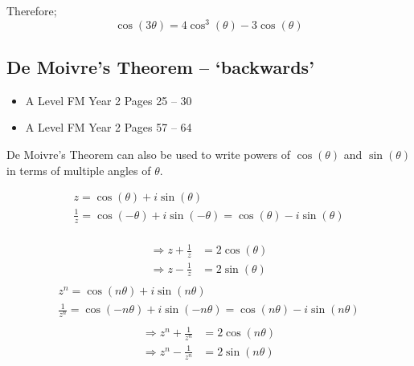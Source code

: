 \documentclass[11pt, a4paper]{article}
\begin{document}
Therefore;
\begin{equation*}
\cos(3\theta)=4\cos^{3}(\theta)-3\cos(\theta)
\end{equation*}
\vspace{0.25cm}


\subsection{De Moivre's Theorem -- `backwards'}
\begin{itemize}
\item A Level FM Year 2 \hspace{1cm} \phantom{AS /} Pages 25 -- 30
\item A Level FM Year 2 \hspace{1cm} \phantom{AS /} Pages 57 -- 64
\end{itemize} \par
De Moivre's Theorem can also be used to write powers of $\cos(\theta)$ and $\sin(\theta)$ in terms of multiple angles of $\theta$.

\begin{gather*}
z=\cos(\theta)+i\sin(\theta) \\
\frac{1}{z}=\cos(-\theta)+i\sin(-\theta)=\cos(\theta)-i\sin(\theta) \\
\end{gather*}

\begin{align*}
\Rightarrow z+\frac{1}{z}&=2\cos(\theta) \\
\Rightarrow z-\frac{1}{z}&=2\sin(\theta) \\
\end{align*}
\vspace{-.75cm}
\begin{gather*}
z^{n}=\cos(n\theta)+i\sin(n\theta) \\
\frac{1}{z^{n}}=\cos(-n\theta)+i\sin(-n\theta)=\cos(n\theta)-i\sin(n\theta) \\
\end{gather*}
\vspace{-1cm}
\begin{align*}
\Rightarrow z^{n}+\frac{1}{z^{n}}&=2\cos(n\theta) \\
\Rightarrow z^{n}-\frac{1}{z^{n}}&=2\sin(n\theta) \\
\end{align*}
\vspace{0.5cm}
\end{document}
